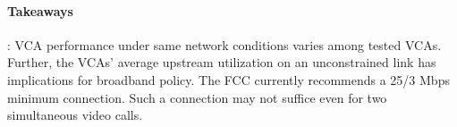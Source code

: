 
\begin{mdframed}[roundcorner=5pt, backgroundcolor=black!10]
\paragraph{Takeaways}: VCA performance under same network conditions varies
    among tested VCAs. Further, the VCAs' average upstream utilization on an unconstrained link has implications for broadband policy. The FCC currently recommends a 25/3 Mbps minimum connection. Such a connection may not suffice even for two simultaneous video calls. 
\end{mdframed}